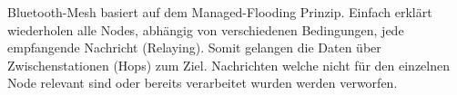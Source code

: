 Bluetooth-Mesh basiert auf dem Managed-Flooding Prinzip. Einfach erklärt wiederholen alle Nodes, abhängig von verschiedenen Bedingungen, jede empfangende Nachricht (Relaying). Somit gelangen die Daten über Zwischenstationen (Hops) zum Ziel. Nachrichten welche nicht für den einzelnen Node relevant sind oder bereits verarbeitet wurden werden verworfen. \\











